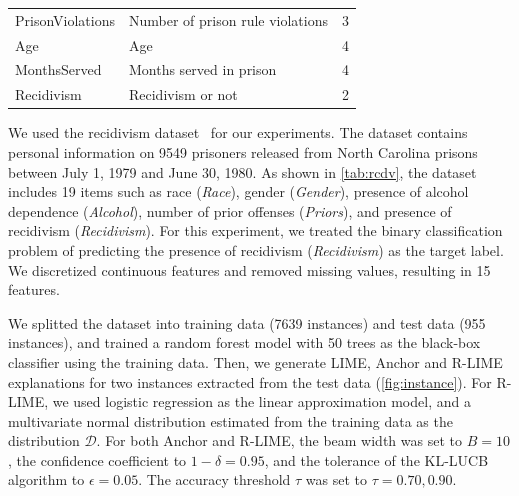 \documentclass[runningheads]{llncs}
\begin{document}
{\begin{table}[tbp]
\begin{tabular}{llc}
      PrisonViolations       & Number of prison rule violations      & 3                     \\
      Age                    & Age                                   & 4                     \\
      MonthsServed           & Months served in prison               & 4                     \\
      \midrule
      Recidivism             & Recidivism or not                     & 2                     \\
      \bottomrule
    \end{tabular}
  \end{table}
}

We used the recidivism dataset~\cite{schmidt1988predicting} for our experiments.
The dataset contains personal information on 9549 prisoners released from
North Carolina prisons between July 1, 1979 and June 30, 1980.
As shown in \cref{tab:rcdv}, the dataset includes 19 items such as
race (\emph{Race}), gender (\emph{Gender}),
presence of alcohol dependence (\emph{Alcohol}),
number of prior offenses (\emph{Priors}),
and presence of recidivism (\emph{Recidivism}).
For this experiment,
we treated the binary classification problem of predicting
the presence of recidivism (\emph{Recidivism}) as the target label.
We discretized continuous features and removed missing values,
resulting in 15 features.

We splitted the dataset into training data (7639 instances) and test data (955 instances),
and trained a random forest model with 50 trees as the black-box classifier
using the training data.
Then, we generate LIME, Anchor and R-LIME explanations
for two instances extracted from the test data (\cref{fig:instance}).
For R-LIME, we used logistic regression as the linear approximation model,
and a multivariate normal distribution estimated from the training data
as the distribution $\mathcal{D}$.
For both Anchor and R-LIME, the beam width was set to $B=10$,
the confidence coefficient to $1-\delta=0.95$,
and the tolerance of the KL-LUCB algorithm to $\epsilon=0.05$.
The accuracy threshold $\tau$ was set to $\tau=0.70,0.90$.
\end{document}
